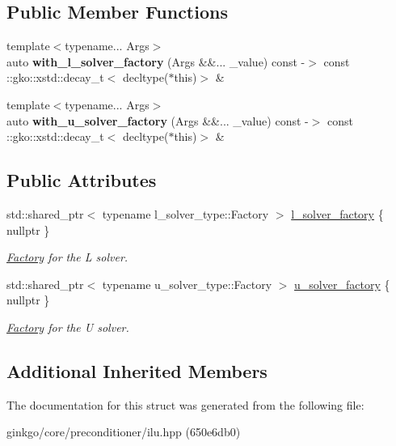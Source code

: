 \subsection*{Public Member Functions}
\begin{DoxyCompactItemize}
\item 
\mbox{\label{structgko_1_1preconditioner_1_1Ilu_1_1parameters__type_acc9828c7bcaf986c8eef680605327607}} 
{\footnotesize template$<$typename... Args$>$ }\\auto {\bfseries with\+\_\+l\+\_\+solver\+\_\+factory} (Args \&\&... \+\_\+value) const -\/$>$ const \+::gko\+::xstd\+::decay\+\_\+t$<$ decltype($\ast$this)$>$ \&
\item 
\mbox{\label{structgko_1_1preconditioner_1_1Ilu_1_1parameters__type_a8f16caf9b5b6a59009145f6deae5f21d}} 
{\footnotesize template$<$typename... Args$>$ }\\auto {\bfseries with\+\_\+u\+\_\+solver\+\_\+factory} (Args \&\&... \+\_\+value) const -\/$>$ const \+::gko\+::xstd\+::decay\+\_\+t$<$ decltype($\ast$this)$>$ \&
\end{DoxyCompactItemize}
\subsection*{Public Attributes}
\begin{DoxyCompactItemize}
\item 
\mbox{\label{structgko_1_1preconditioner_1_1Ilu_1_1parameters__type_ada0b04dfe42247a5e19edcc28696cfe3}} 
std\+::shared\+\_\+ptr$<$ typename l\+\_\+solver\+\_\+type\+::\+Factory $>$ \hyperlink{structgko_1_1preconditioner_1_1Ilu_1_1parameters__type_ada0b04dfe42247a5e19edcc28696cfe3}{l\+\_\+solver\+\_\+factory} \{ nullptr \}
\begin{DoxyCompactList}\small\item\em \hyperlink{classgko_1_1preconditioner_1_1Ilu_1_1Factory}{Factory} for the L solver. \end{DoxyCompactList}\item 
\mbox{\label{structgko_1_1preconditioner_1_1Ilu_1_1parameters__type_a7afe80d372d61e3467a0abe1927ba207}} 
std\+::shared\+\_\+ptr$<$ typename u\+\_\+solver\+\_\+type\+::\+Factory $>$ \hyperlink{structgko_1_1preconditioner_1_1Ilu_1_1parameters__type_a7afe80d372d61e3467a0abe1927ba207}{u\+\_\+solver\+\_\+factory} \{ nullptr \}
\begin{DoxyCompactList}\small\item\em \hyperlink{classgko_1_1preconditioner_1_1Ilu_1_1Factory}{Factory} for the U solver. \end{DoxyCompactList}\end{DoxyCompactItemize}
\subsection*{Additional Inherited Members}


The documentation for this struct was generated from the following file\+:\begin{DoxyCompactItemize}
\item 
ginkgo/core/preconditioner/ilu.\+hpp (650e6db0)\end{DoxyCompactItemize}
